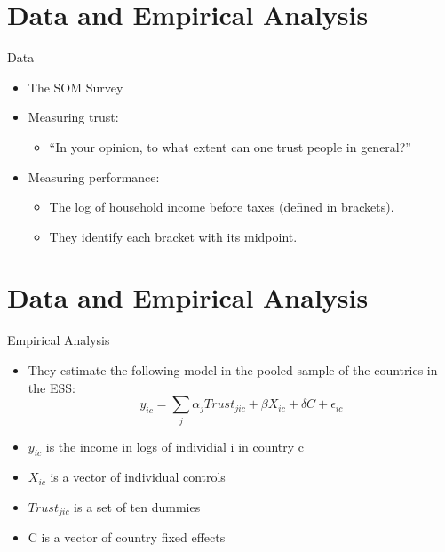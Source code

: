 \documentclass[pdftex,12pt,xcolor=pdftex,table]{beamer}
\begin{document}
\section{Data and Empirical Analysis}
\begin{frame}{Data}
    \begin{itemize}
        \item The SOM Survey
        \item Measuring trust:
        \begin{itemize}
            \item “In your opinion, to what extent can one trust people in general?”
        \end{itemize}
        \item Measuring performance:
        \begin{itemize}
            \item The log of household
income before taxes (defined in brackets).
           \item They identify each bracket with its midpoint.
        \end{itemize}
    \end{itemize}
\end{frame}

\section{Data and Empirical Analysis}
\begin{frame}{Empirical Analysis}
\begin{itemize}
    \item They estimate the following model in the pooled sample of the countries in the ESS:
        \begin{equation*}
        y_{ic} = \sum_j\alpha_jTrust_{jic}+\beta X_{ic} +\delta C+\epsilon_{ic}
        \end{equation*}
    \item $y_{ic}$ is the income in logs of individial i in country c
    \item $X_{ic}$ is a vector of individual controls
    \item $Trust_{jic}$ is a set of ten dummies 
    \item C is a vector of country fixed effects
\end{itemize}
\end{frame}
\end{document}
